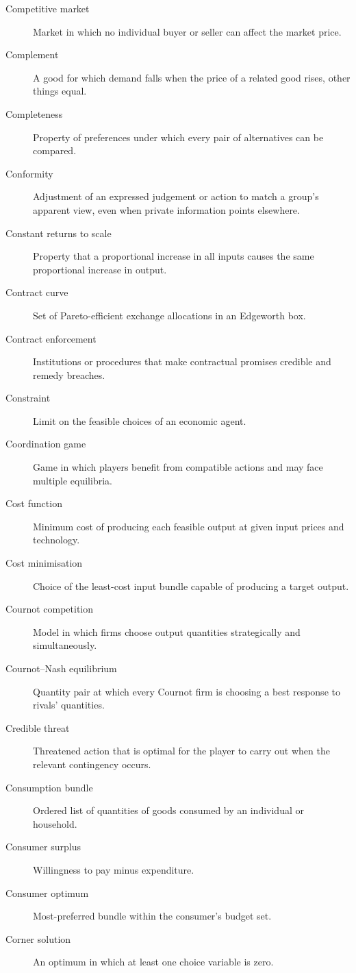 \begin{description}
  \item[Competitive market] Market in which no individual buyer or seller can affect the market price.
  \item[Complement] A good for which demand falls when the price of a related good rises, other things equal.
  \item[Completeness] Property of preferences under which every pair of alternatives can be compared.
  \item[Conformity] Adjustment of an expressed judgement or action to match a group's apparent view, even when private information points elsewhere.
  \item[Constant returns to scale] Property that a proportional increase in all inputs causes the same proportional increase in output.
  \item[Contract curve] Set of Pareto-efficient exchange allocations in an Edgeworth box.
  \item[Contract enforcement] Institutions or procedures that make contractual promises credible and remedy breaches.
  \item[Constraint] Limit on the feasible choices of an economic agent.
  \item[Coordination game] Game in which players benefit from compatible actions and may face multiple equilibria.
  \item[Cost function] Minimum cost of producing each feasible output at given input prices and technology.
  \item[Cost minimisation] Choice of the least-cost input bundle capable of producing a target output.
  \item[Cournot competition] Model in which firms choose output quantities strategically and simultaneously.
  \item[Cournot--Nash equilibrium] Quantity pair at which every Cournot firm is choosing a best response to rivals' quantities.
  \item[Credible threat] Threatened action that is optimal for the player to carry out when the relevant contingency occurs.
  \item[Consumption bundle] Ordered list of quantities of goods consumed by an individual or household.
  \item[Consumer surplus] Willingness to pay minus expenditure.
  \item[Consumer optimum] Most-preferred bundle within the consumer's budget set.
  \item[Corner solution] An optimum in which at least one choice variable is zero.

\end{description}
